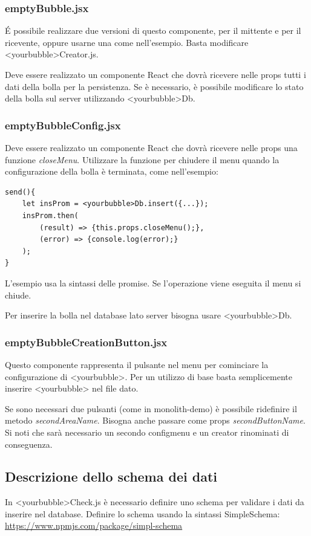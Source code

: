 \subsubsection{emptyBubble.jsx}
\'E possibile realizzare due versioni di questo componente, per il mittente e per il ricevente, oppure usarne una come nell'esempio. Basta modificare <yourbubble>Creator.js.

Deve essere realizzato un componente React che dovrà ricevere nelle props tutti i dati della bolla per la persistenza. Se è necessario, è possibile modificare lo stato della bolla sul server utilizzando <yourbubble>Db.

\subsubsection{emptyBubbleConfig.jsx}
Deve essere realizzato un componente React che dovrà ricevere nelle props una funzione \emph{closeMenu}. Utilizzare la funzione per chiudere il menu quando la configurazione della bolla è terminata, come nell'esempio:

\begin{lstlisting}
send(){
	let insProm = <yourbubble>Db.insert({...});
	insProm.then(
		(result) => {this.props.closeMenu();},
		(error) => {console.log(error);}
	);
}
\end{lstlisting}

L'esempio usa la sintassi delle promise. Se l'operazione viene eseguita il menu si chiude. 

Per inserire la bolla nel database lato server bisogna usare <yourbubble>Db.

\subsubsection{emptyBubbleCreationButton.jsx}
Questo componente rappresenta il pulsante nel menu per cominciare la configurazione di <yourbubble>. Per un utilizzo di base basta semplicemente inserire <yourbubble> nel file dato.

Se sono necessari due pulsanti (come in monolith-demo) è possibile ridefinire il metodo \emph{secondAreaName}. Bisogna anche passare come props \emph{secondButtonName}. Si noti che sarà necessario un secondo configmenu e un creator
rinominati di conseguenza.

\subsection{Descrizione dello schema dei dati}
In <yourbubble>Check.js è necessario definire uno schema per validare i dati da inserire nel database. Definire lo schema usando la sintassi SimpleSchema: \url{https://www.npmjs.com/package/simpl-schema}

